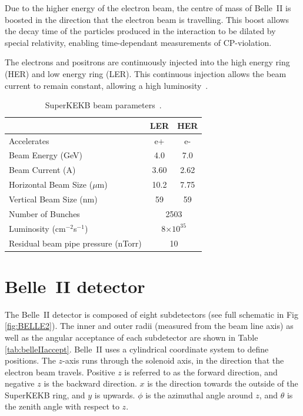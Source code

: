 Due to the higher energy of the electron beam, the centre of mass of Belle~II is boosted in the direction that the electron beam is travelling. This boost allows the decay time of the particles produced in the interaction to be dilated by special relativity, enabling time-dependant measurements of CP-violation. 

The electrons and positrons are continuously injected into the high energy ring (HER) and low energy ring (LER). This continuous injection allows the beam current to remain constant, allowing a high luminosity~\cite{BELLE2TDR, ohnishi2013accelerator}.


\begin{table}[htb]
	\centering
	\begin{tabular}{ lcc }
	&	LER	&	HER	\\	\hline \hline
Accelerates	&	e+	&	e-	\\	
Beam Energy (GeV)	&	4.0	&	7.0	\\	
Beam Current (A)	&	3.60	&	2.62	\\	
Horizontal Beam Size ($\mu$m) & 10.2 & 7.75 \\
Vertical Beam Size (nm) & 59  &  59 \\
Number of Bunches	&	\multicolumn{2}{c}{2503}			\\	
Luminosity (cm$^{-2}$s$^{-1}$)	&	\multicolumn{2}{c}{8$\times 10^{35}$}			\\	
Residual beam pipe pressure (nTorr) &  \multicolumn{2}{c}{10}  \\ \hline

	\end{tabular}
	\caption[SuperKEKB beam parameters]{SuperKEKB beam parameters~\cite{BELLE2TDR}.}
	\label{tab:SKBBEAM}
\end{table}



\section{Belle~II detector}

The Belle~II detector is composed of eight subdetectors (see full schematic in Fig \ref{fig:BELLE2}). The inner and outer radii (measured from the beam line axis) as well as the angular acceptance of each subdetector are shown in Table \ref{tab:belleIIaccept}.  Belle~II uses a cylindrical coordinate system to define positions. The $z$-axis runs through the solenoid axis, in the direction that the electron beam travels. Positive $z$ is referred to as the forward direction, and negative $z$ is the backward direction. $x$ is the direction towards the outside of the SuperKEKB ring, and $y$ is upwards. $\phi$ is the azimuthal angle around $z$, and $\theta$ is the zenith angle with respect to $z$.


